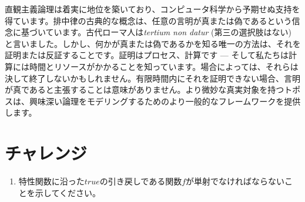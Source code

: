 直観主義論理は着実に地位を築いており、コンピュータ科学から予期せぬ支持を得ています。排中律の古典的な概念は、任意の言明が真または偽であるという信念に基づいています。古代ローマ人は\emph{tertium non datur} (第三の選択肢はない) と言いました。しかし、何かが真または偽であるかを知る唯一の方法は、それを証明または反証することです。証明はプロセス、計算です --- そして私たちは計算には時間とリソースがかかることを知っています。場合によっては、それらは決して終了しないかもしれません。有限時間内にそれを証明できない場合、言明が真であると主張することは意味がありません。より微妙な真実対象を持つトポスは、興味深い論理をモデリングするためのより一般的なフレームワークを提供します。

\section{チャレンジ}

\begin{enumerate}
  \tightlist
  \item
        特性関数に沿った\(\mathit{true}\)の引き戻しである関数\(f\)が単射でなければならないことを示してください。
\end{enumerate}


